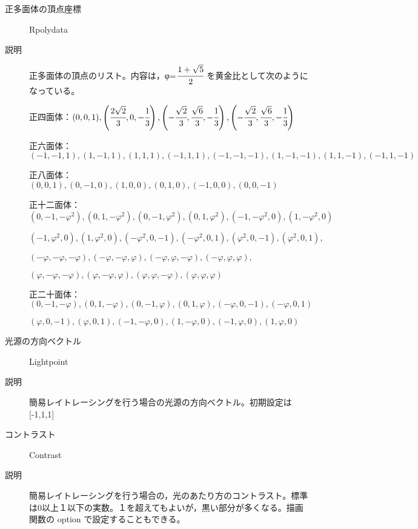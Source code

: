 \documentclass[papersize,a4paper,12pt,uplatex]{jsarticle}
\begin{document}
\begin{description}
\hypertarget{rpolydata}{}
\item[正多面体の頂点座標]  Rpolydata
\item[説明]  正多面体の頂点のリスト。内容は，φ=$\cfrac{1+\sqrt{5}}{2}$ を黄金比として次のようになっている。

正四面体：$(0,0,1),\left(\cfrac{2\sqrt{2}}{3},0,-\cfrac{1}{3} \right),\left(-\cfrac{\sqrt{2}}{3},\cfrac{\sqrt{6}}{3},-\cfrac{1}{3} \right),\left(-\cfrac{\sqrt{2}}{3},\cfrac{\sqrt{6}}{3},-\cfrac{1}{3}\right)$ 

正六面体：$(-1,-1,1),(1,-1,1),(1,1,1),(-1,1,1),(-1,-1,-1),(1,-1,-1),(1,1,-1),(-1,1,-1)$ 

正八面体：$(0,0,1),(0,-1,0),(1,0,0),(0,1,0),(-1,0,0),(0,0,-1)$ 

正十二面体：$(0,-1,-φ^2),(0,1,-φ^2),(0,-1,φ^2),(0,1,φ^2),(-1,-φ^2,0),(1,-φ^2,0) $

\hspace{15mm}   $ (-1,φ^2,0),(1,φ^2,0),(-φ^2,0,-1),(-φ^2,0,1),(φ^2,0,-1),(φ^2,0,1), $
     
\hspace{15mm} $ (-φ,-φ,-φ),(-φ,-φ,φ),(-φ,φ,-φ),(-φ,φ,φ), $

\hspace{15mm} $ (φ,-φ,-φ),(φ,-φ,φ),(φ,φ,-φ),(φ,φ,φ)$ 

正二十面体：$(0,-1,-φ),(0,1,-φ),(0,-1,φ),(0,1,φ),(-φ,0,-1),(-φ,0,1) $

\hspace{15mm}$ (φ,0,-1),(φ,0,1),(-1,-φ,0),(1,-φ,0),(-1,φ,0),(1,φ,0)$ 
      
\vspace{\baselineskip}
\hypertarget{lightpoint}{}
\item[光源の方向ベクトル] Lightpoint
\item[説明] 簡易レイトレーシングを行う場合の光源の方向ベクトル。初期設定は[-1,1,1]

\vspace{\baselineskip}
\hypertarget{contrast}{}
\item[コントラスト] Contrast
\item[説明] 簡易レイトレーシングを行う場合の，光のあたり方のコントラスト。標準は0以上１以下の実数。１を超えてもよいが，黒い部分が多くなる。描画関数の option で設定することもできる。


\end{description}
\newpage
\end{document}
